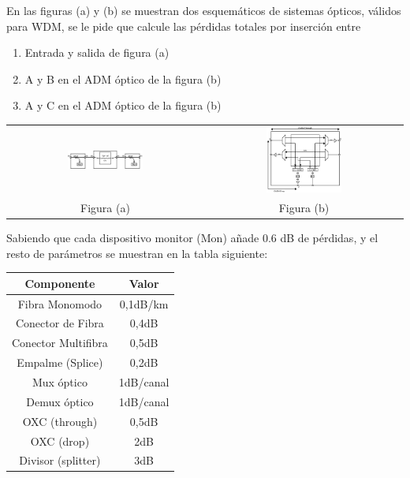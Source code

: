 \begin{exercise}[8]
	En las figuras (a) y (b) se muestran dos esquemáticos de sistemas ópticos, válidos para WDM, se le pide que calcule las pérdidas totales por inserción entre
\begin{enumerate}
	\item Entrada y salida de figura (a)
	\item A y B en el ADM óptico de la figura (b)
	\item A y C en el ADM óptico de la figura (b)
\end{enumerate}
\begin{center}
\begin{tabular}{c c}
	\includegraphics[width=0.4\textwidth]{Imagen/ejercicio8tema3a.jpg}
	& 
	\includegraphics[width=0.4\textwidth]{Imagen/ejercicio8tema3b.jpg} \\
	Figura (a) & Figura (b)
\end{tabular}
\end{center}
Sabiendo que cada dispositivo monitor (Mon) añade 0.6 dB de pérdidas, y el resto de parámetros se muestran en la tabla siguiente:
\begin{center}
\begin{tabular}{c | c}
\hline
	\textbf{Componente} 	& \textbf{Valor}\\\hline
	Fibra Monomodo			& 0,1dB/km\\
	Conector de Fibra		& 0,4dB\\
	Conector Multifibra		& 0,5dB\\
	Empalme (Splice)		& 0,2dB\\
	Mux óptico				& 1dB/canal\\
	Demux óptico			& 1dB/canal\\
	OXC (through)			& 0,5dB\\
	OXC (drop)				& 2dB\\
	Divisor (splitter)		& 3dB\\

\end{tabular}
\end{center}
\end{exercise}
